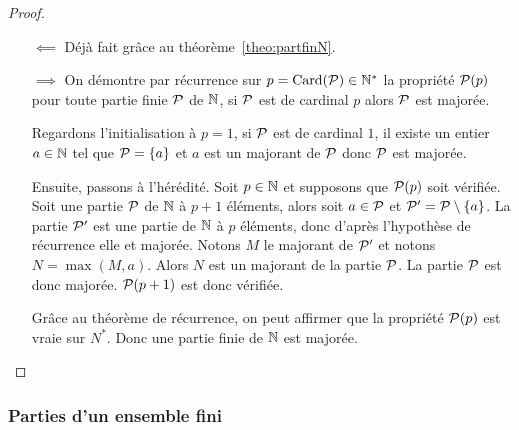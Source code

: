 \begin{proof}
  \begin{itemize}
  \item[\(\impliedby\)] Déjà fait grâce au théorème~\ref{theo:partfinN}.
  \item[\(\implies\)] On démontre par récurrence sur \(p=\Card(\P)\in \N^*\) la propriété \(\P(p)\) pour toute partie finie \(\P\) de \(\N\), si \(\P\) est de cardinal \(p\) alors \(\P\) est majorée. 

Regardons l'initialisation à \(p=1\), si \(\P\) est de cardinal \(1\), il existe un entier \(a\in\N\) tel que \(\P=\{a\}\) et \(a\) est un majorant de \(\P\) donc \(\P\) est majorée.

Ensuite, passons à l'hérédité. Soit \(p \in \N\) et supposons que \(\P(p)\) soit vérifiée. Soit une partie \(\P\) de \(\N\) à \(p+1\) éléments, alors soit \(a\in \P\) et \(\P'=\P\setminus\{a\}\). La partie \(\P'\) est une partie de \(\N\) à \(p\) éléments, donc d'après l'hypothèse de récurrence elle et majorée. Notons \(M\) le majorant de \(\P'\) et notons \(N=\max(M,a)\). Alors \(N\) est un majorant de la partie \(\P\). La partie \(\P\) est donc majorée. \(\P(p+1)\) est donc vérifiée.

Grâce au théorème de récurrence, on peut affirmer que la propriété \(\P(p)\) est vraie sur \(N^*\). Donc une partie finie de \(\N\) est majorée.
  \end{itemize}
\end{proof}

\subsubsection{Parties d'un ensemble fini}

